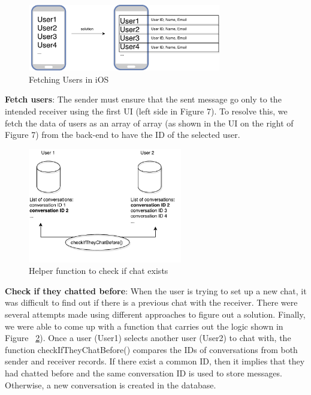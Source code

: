 \begin{figure}[ht]
\centering
\includegraphics[width=0.75\textwidth]{figs/iOS_fetch_users_ID_issue_and_solution}
	\caption{Fetching Users in iOS}
	\label{fig:iOS_fetch_users_ID_issue_and_solution}
\end{figure}
  

\textbf{Fetch users}: The sender must ensure that the sent message go only to the intended receiver using the first UI (left side in Figure 7). To resolve this, we fetch the data of users as an array of array (as shown in the UI on the right of Figure 7) from the back-end to have the ID of the selected user.

\begin{figure}[ht]
\centering
\includegraphics[width=0.6\textwidth]{figs/iOS_check_if_they_chatted_before}
	\caption{Helper function to check if chat exists}
	\label{fig:iOS_check_if_they_chatted_before}
\end{figure}

\textbf{Check if they chatted before}: When the user is trying to set up a new chat, it was difficult to find out if there is a previous chat with the receiver. There were several attempts made using different approaches to figure out a solution. Finally, we were able to come up with a function that carries out the logic shown in Figure ~\ref{fig:iOS_check_if_they_chatted_before}). Once a user (User1) selects another user (User2) to chat with, the function checkIfTheyChatBefore() compares the IDs of conversations from both sender and receiver records.  If there exist a common ID, then it implies that they had chatted before and the same conversation ID is used to store messages. Otherwise, a new conversation is created in the database.


